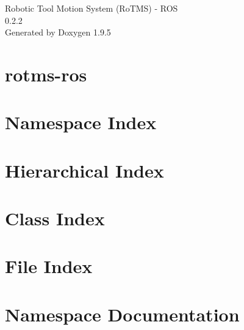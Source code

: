 \documentclass[twoside]{book}
\newcommand{\+}{\discretionary{\mbox{\scriptsize$\hookleftarrow$}}{}{}}
\newcommand{\clearemptydoublepage}{%
    \newpage{\pagestyle{empty}\cleardoublepage}%
  }
\begin{document}
  \raggedbottom
    \hypersetup{pageanchor=false,
                bookmarksnumbered=true,
                pdfencoding=unicode
               }
  \begin{titlepage}
  \vspace*{7cm}
  \begin{center}%
  {\Large Robotic Tool Motion System (\+Ro\+TMS) -\/ ROS}\\
  [1ex]\large 0.\+2.\+2 \\
  \vspace*{1cm}
  {\large Generated by Doxygen 1.9.5}\\
  \end{center}
  \end{titlepage}
  \clearemptydoublepage
  \tableofcontents
  \clearemptydoublepage
  \hypersetup{pageanchor=true}
\chapter{rotms-\/ros}
\label{md_README}

\chapter{Namespace Index}

\chapter{Hierarchical Index}

\chapter{Class Index}

\chapter{File Index}

\chapter{Namespace Documentation}

\end{document}
